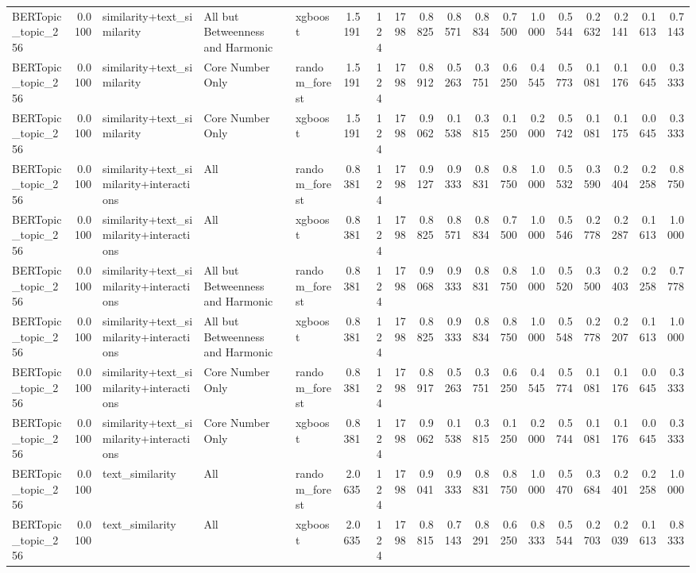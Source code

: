 \begin{tabular}{lrlllrrrrrrrrrrrrr}
BERTopic_topic_256 & 0.0100 & similarity+text_similarity & All but Betweenness and Harmonic & xgboost & 1.5191 & 124 & 1798 & 0.8825 & 0.8571 & 0.8834 & 0.7500 & 1.0000 & 0.5544 & 0.2632 & 0.2141 & 0.1613 & 0.7143 \\
BERTopic_topic_256 & 0.0100 & similarity+text_similarity & Core Number Only & random_forest & 1.5191 & 124 & 1798 & 0.8912 & 0.5263 & 0.3751 & 0.6250 & 0.4545 & 0.5773 & 0.1081 & 0.1176 & 0.0645 & 0.3333 \\
BERTopic_topic_256 & 0.0100 & similarity+text_similarity & Core Number Only & xgboost & 1.5191 & 124 & 1798 & 0.9062 & 0.1538 & 0.3815 & 0.1250 & 0.2000 & 0.5742 & 0.1081 & 0.1175 & 0.0645 & 0.3333 \\
BERTopic_topic_256 & 0.0100 & similarity+text_similarity+interactions & All & random_forest & 0.8381 & 124 & 1798 & 0.9127 & 0.9333 & 0.8831 & 0.8750 & 1.0000 & 0.5532 & 0.3590 & 0.2404 & 0.2258 & 0.8750 \\
BERTopic_topic_256 & 0.0100 & similarity+text_similarity+interactions & All & xgboost & 0.8381 & 124 & 1798 & 0.8825 & 0.8571 & 0.8834 & 0.7500 & 1.0000 & 0.5546 & 0.2778 & 0.2287 & 0.1613 & 1.0000 \\
BERTopic_topic_256 & 0.0100 & similarity+text_similarity+interactions & All but Betweenness and Harmonic & random_forest & 0.8381 & 124 & 1798 & 0.9068 & 0.9333 & 0.8831 & 0.8750 & 1.0000 & 0.5520 & 0.3500 & 0.2403 & 0.2258 & 0.7778 \\
BERTopic_topic_256 & 0.0100 & similarity+text_similarity+interactions & All but Betweenness and Harmonic & xgboost & 0.8381 & 124 & 1798 & 0.8825 & 0.9333 & 0.8834 & 0.8750 & 1.0000 & 0.5548 & 0.2778 & 0.2207 & 0.1613 & 1.0000 \\
BERTopic_topic_256 & 0.0100 & similarity+text_similarity+interactions & Core Number Only & random_forest & 0.8381 & 124 & 1798 & 0.8917 & 0.5263 & 0.3751 & 0.6250 & 0.4545 & 0.5774 & 0.1081 & 0.1176 & 0.0645 & 0.3333 \\
BERTopic_topic_256 & 0.0100 & similarity+text_similarity+interactions & Core Number Only & xgboost & 0.8381 & 124 & 1798 & 0.9062 & 0.1538 & 0.3815 & 0.1250 & 0.2000 & 0.5744 & 0.1081 & 0.1176 & 0.0645 & 0.3333 \\
BERTopic_topic_256 & 0.0100 & text_similarity & All & random_forest & 2.0635 & 124 & 1798 & 0.9041 & 0.9333 & 0.8831 & 0.8750 & 1.0000 & 0.5470 & 0.3684 & 0.2401 & 0.2258 & 1.0000 \\
BERTopic_topic_256 & 0.0100 & text_similarity & All & xgboost & 2.0635 & 124 & 1798 & 0.8815 & 0.7143 & 0.8291 & 0.6250 & 0.8333 & 0.5544 & 0.2703 & 0.2039 & 0.1613 & 0.8333 \\

\end{tabular}
